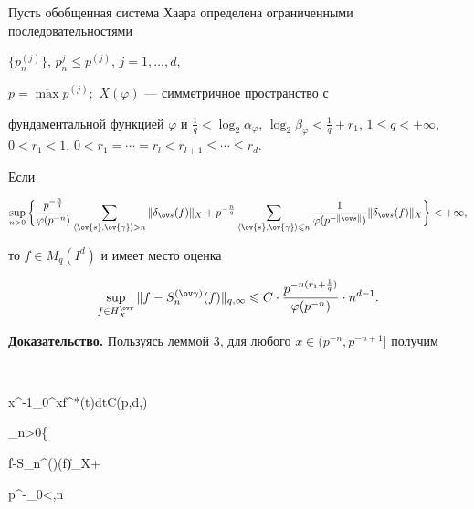 \begin{thm}


Пусть обобщенная система Хаара определена ограниченными последовательностями 


$\{p_{n}^{(j)}\}$, $p_{n}^{j}\leq p^{(j)}$, $j=1,\dotsc,d$,


$p=\overline{\max}p^{(j)};$ $X(\varphi)$ --- симметричное пространство с 


фундаментальной функцией $\varphi$ и $\frac{1}{q}<\log_{2} 


\alpha_{\varphi}$, $\log_{2} \beta_{\varphi}<\frac{1}{q}+r_{1}$, $1\leq 


q<+\infty$, $0<r_{1}<1$, $0<r_{1}=\dotsb=r_{l}<r_{l+1}\leq\dotsb\leq r_{d}$. 


Если


\begin{equation}


\sup_{n>0}\bigg\{\frac{p^{-\frac{n}{q}}}{\varphi(p^{-n})}\sum_{\la\ov{s},


\ov{\gamma}\ra>n}\|\delta_{\ov s}(f)\|_{X}+p^{-\frac{n}{q}}


\sum_{\la\ov{s}, \ov{\gamma}\ra\leq n}\frac{1}{\varphi(p^{-\|\ov s\|})}


\|\delta_{\ov s}(f)\|_{X}\bigg\}<+\infty,


\end{equation}


то $f\in M_{q}(I^{d})$ и имеет место оценка


$$


\sup_{f\in H_{X}^{\ov r}}\|f-S_{n}^{(\ov\gamma)}(f)\|_{q,\infty}


\leq C\cdot \frac{p^{-n(r_{1}+\frac{1}{q})}}{\varphi(p^{-n})}\cdot n^{d-1}.


$$


\end{thm}








{\bf Доказательство.} Пользуясь леммой 3, для любого $x\in (p^{-n}, 


p^{-n+1}]$ получим


$$


x^{-1}\int_{0}^{x}f^{*}(t)dt\leq C(p,d,\varphi) 


\sup_{n>0}\bigg\{ 


\|f-S_{n}^{(\ov\gamma)}(f)\|_{X}+


p^{-}\sum_{0<\la{},\ov{\gamma}\ra\leq n} 


